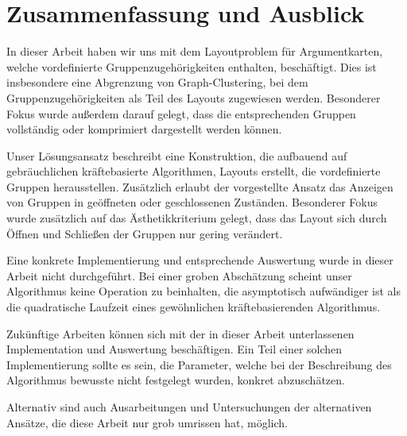\chapter{Zusammenfassung und Ausblick}
\label{ch:zsf}

In dieser Arbeit haben wir uns mit dem Layoutproblem für Argumentkarten, welche vordefinierte Gruppenzugehörigkeiten enthalten, beschäftigt. Dies ist insbesondere eine Abgrenzung von Graph-Clustering, bei dem Gruppenzugehörigkeiten als Teil des Layouts zugewiesen werden. Besonderer Fokus wurde außerdem darauf gelegt, dass die entsprechenden Gruppen vollständig oder komprimiert dargestellt werden können.

Unser Lösungsansatz beschreibt eine Konstruktion, die aufbauend auf gebräuchlichen kräftebasierte Algorithmen, Layouts erstellt, die vordefinierte Gruppen herausstellen. Zusätzlich erlaubt der vorgestellte Ansatz das Anzeigen von Gruppen in geöffneten oder geschlossenen Zuständen. Besonderer Fokus wurde zusätzlich auf das Ästhetikkriterium gelegt, dass das Layout sich durch Öffnen und Schließen der Gruppen nur gering verändert.

Eine konkrete Implementierung und entsprechende Auswertung wurde in dieser Arbeit nicht durchgeführt.
Bei einer groben Abschätzung scheint unser Algorithmus keine Operation zu beinhalten, die asymptotisch aufwändiger ist als die quadratische Laufzeit eines gewöhnlichen kräftebasierenden Algorithmus.

Zukünftige Arbeiten können sich mit der in dieser Arbeit unterlassenen Implementation und Auswertung beschäftigen. Ein Teil einer solchen Implementierung sollte es sein, die Parameter, welche bei der Beschreibung des Algorithmus bewusste nicht festgelegt wurden, konkret abzuschätzen.

Alternativ sind auch Ausarbeitungen und Untersuchungen der alternativen Ansätze, die diese Arbeit nur grob umrissen hat, möglich.

